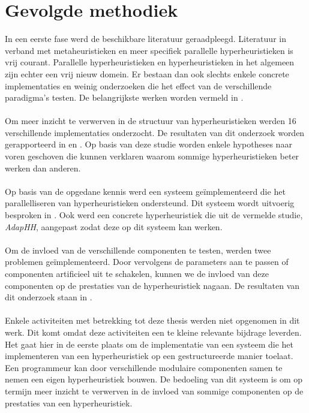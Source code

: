 \section{Gevolgde methodiek}

In een eerste fase werd de beschikbare literatuur geraadpleegd. Literatuur in verband met metaheuristieken en meer specifiek parallelle hyperheuristieken is vrij courant. Parallelle hyperheuristieken en hyperheuristieken in het algemeen zijn echter een vrij nieuw domein. Er bestaan dan ook slechts enkele concrete implementaties en weinig onderzoeken die het effect van de verschillende paradigma's testen. De belangrijkste werken worden vermeld in .

\paragraph{}
Om meer inzicht te verwerven in de structuur van hyperheuristieken werden 16 verschillende implementaties onderzocht. De resultaten van dit onderzoek worden gerapporteerd in  en . Op basis van deze studie worden enkele hypotheses naar voren geschoven die kunnen verklaren waarom sommige hyperheuristieken beter werken dan anderen.

\paragraph{}
Op basis van de opgedane kennis werd een systeem ge\"implementeerd die het parallelliseren van hyperheuristieken ondersteund. Dit systeem wordt uitvoerig besproken in . Ook werd een concrete hyperheuristiek die uit de vermelde studie, \emph{AdapHH}, aangepast zodat deze op dit systeem kan werken.

\paragraph{}
Om de invloed van de verschillende componenten te testen, werden twee problemen ge\"implementeerd. Door vervolgens de parameters aan te passen of componenten artificieel uit te schakelen, kunnen we de invloed van deze componenten op de prestaties van de hyperheuristiek nagaan. De resultaten van dit onderzoek staan in .

\paragraph{}
Enkele activiteiten met betrekking tot deze thesis werden niet opgenomen in dit werk. Dit komt omdat deze activiteiten een te kleine relevante bijdrage leverden. Het gaat hier in de eerste plaats om de implementatie van een systeem die het implementeren van een hyperheuristiek op een gestructureerde manier toelaat. Een programmeur kan door verschillende modulaire componenten samen te nemen een eigen hyperheuristiek bouwen. De bedoeling van dit systeem is om op termijn meer inzicht te verwerven in de invloed van sommige componenten op de prestaties van een hyperheuristiek.


